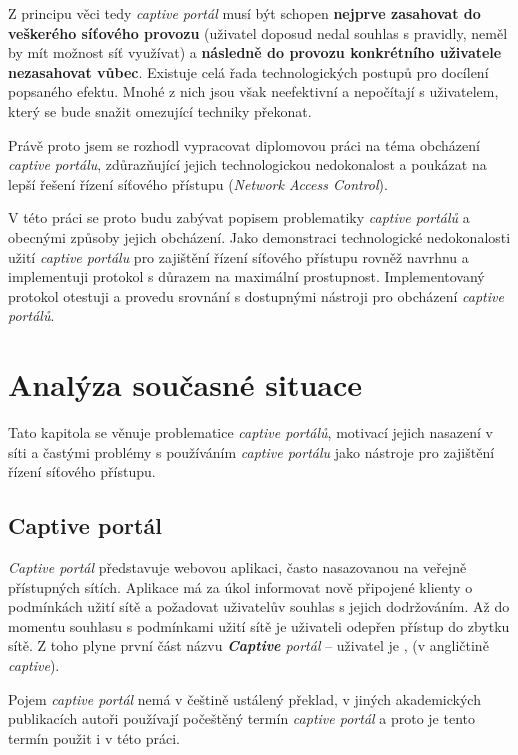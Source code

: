 \documentclass[thesis=M,czech]{FITthesis}[2012/10/20]
\begin{document}
\begin{introduction}
Z principu věci tedy \textit{captive portál} musí být schopen \textbf{nejprve zasahovat do veškerého síťového provozu} (uživatel doposud nedal souhlas s pravidly, neměl by mít možnost síť využívat) a \textbf{následně do provozu konkrétního uživatele nezasahovat vůbec}. Existuje celá řada technologických postupů pro docílení popsaného efektu. Mnohé z nich jsou však neefektivní a nepočítají s  uživatelem, který se bude snažit omezující techniky překonat.

Právě proto jsem se rozhodl vypracovat diplomovou práci na téma obcházení \textit{captive portálu}, zdůrazňující jejich technologickou nedokonalost a poukázat na lepší řešení řízení síťového přístupu (\textit{Network Access Control}).

V této práci se proto budu zabývat popisem problematiky \textit{captive portálů} a obecnými způsoby jejich obcházení. Jako demonstraci technologické nedokonalosti užití \textit{captive portálu} pro zajištění řízení síťového přístupu rovněž navrhnu a implementuji protokol s důrazem na maximální prostupnost. Implementovaný protokol otestuji a provedu srovnání s dostupnými nástroji pro obcházení \textit{captive portálů}.
\end{introduction}

\chapter{Analýza současné situace}

Tato kapitola se věnuje problematice \textit{captive portálů}, motivací jejich nasazení v síti a častými problémy s používáním \textit{captive portálu} jako nástroje pro zajištění řízení síťového přístupu.

\section{Captive portál}

\textit{Captive portál}\cite{rfc7710} představuje webovou aplikaci, často nasazovanou na veřejně přístupných sítích. Aplikace má za úkol informovat nově připojené klienty o podmínkách užití sítě a požadovat uživatelův souhlas s jejich dodržováním. Až do momentu souhlasu s podmínkami užití sítě je uživateli odepřen přístup do zbytku sítě. Z toho plyne první část názvu \textit{\textbf{Captive} portál} -- uživatel je ,  (v angličtině \textit{captive}).

Pojem \textit{captive portál} nemá v češtině ustálený překlad, v jiných akademických publikacích \cite{bakalarka-srovnani-captive-fwall-nac} \cite{bakalarka-plzen-nac-kolejni-sit} autoři používají počeštěný termín \textit{captive portál} a proto je tento termín použit i v této práci.
\end{document}
